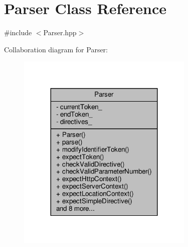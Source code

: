 \hypertarget{classft_1_1_parser}{}\section{Parser Class Reference}
\label{classft_1_1_parser}


{\ttfamily \#include $<$Parser.\+hpp$>$}



Collaboration diagram for Parser\+:
\nopagebreak
\begin{figure}[H]
\begin{center}
\leavevmode
\includegraphics[width=239pt]{classft_1_1_parser__coll__graph}
\end{center}
\end{figure}
